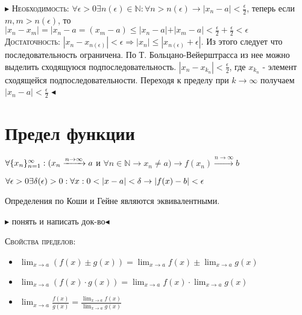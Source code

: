 \documentclass[14pt]{extreport}
\begin{document}
            $\blacktriangleright$
                \textsc{Необходимость:} $\forall \epsilon > 0 \exists n(\epsilon) \in \mathbb{N}: \forall n > n(\epsilon) \rightarrow |x_n - a| < \frac{\epsilon}{2}$, теперь если $m,m>n(\epsilon)$, то $|x_n-x_m| = |x_n -a = (x_m - a) \leq |x_n -a| + | x_m - a| < \frac{\epsilon}{2} + \frac{\epsilon}{2} < \epsilon$ \\
                \textsc{Достаточность: } $|x_n - x_{n(\epsilon)}| < \epsilon \Rightarrow |x_n| \leq |x_{n(\epsilon)} + \epsilon|$. Из этого следует что последовательность ограничена. По Т. Больцано-Вейерштрасса из нее можно выделить сходящуюся подпоследовательность. $|x_n - x_{k_n}| < \frac{\epsilon}{2}$, где $x_{k_n}$ - элемент сходящейся подпоследовательности. Переходя к пределу при $k\rightarrow\infty$ получаем $|x_n - a| < \frac{\epsilon}{2}$ 
            $\blacktriangleleft$
        
        \chapter{Предел функции}

            \begin{definition}
            $\\ \forall \{x_n\}_{n=1}^{\infty}:(x_{n} \xrightarrow{n\rightarrow\infty}a $ и $\forall n \in \mathbb{N} \rightarrow x_n \neq a) \rightarrow f(x_n) \xrightarrow{n\rightarrow\infty}b$
            \end{definition}

            \begin{definition}
                $\\ \forall \epsilon > 0 \exists \delta(\epsilon) > 0: \forall x : 0 < |x-a| < \delta \rightarrow |f(x) - b| < \epsilon$
            \end{definition}

            \begin{theorem}
                Определения по Коши и Гейне являются эквивалентными. 
            \end{theorem}
            $\blacktriangleright$ понять и написать док-во$\blacktriangleleft$


            \textsc{Свойства пределов:}
            \begin{itemize}
                \item $\lim_{x\rightarrow a} (f(x) \pm g(x)) = \lim_{x\rightarrow a} f(x) \pm \lim_{x\rightarrow a} g(x)$
                \item $\lim_{x\rightarrow a} (f(x) \cdot g(x)) = \lim_{x\rightarrow a} f(x) \cdot \lim_{x\rightarrow a} g(x)$
                \item $\lim_{x\rightarrow a} \frac{f(x) }{g(x)} = \frac{\lim_{x\rightarrow a} f(x)}{\lim_{x\rightarrow a} g(x)}$
            \end{itemize}
\end{document}
